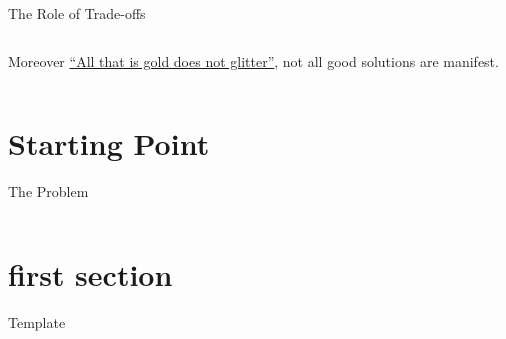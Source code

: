 \documentclass[9pt]{beamer}
\begin{document}
\begin{frame}{The Role of Trade-offs}
\begin{columns}
\begin{column}{0.5\textwidth}
            Moreover
            \href{https://en.wikipedia.org/wiki/All_that_glitters_is_not_gold\#In_popular_culture}{\enquote{All
            that is gold does not glitter}}, not all good solutions are
            manifest.
        \end{column}
    \end{columns}
\end{frame}

\section{Starting Point}

\begin{frame}{The Problem}
    \begin{columns}
        \begin{column}{0.5\textwidth}
            
        \end{column}
        \begin{column}{0.5\textwidth}
            
        \end{column}
    \end{columns}
\end{frame}

\section{first section}

\begin{frame}{Template}
    \begin{columns}
        \begin{column}{0.5\textwidth}
            
        \end{column}
        \begin{column}{0.5\textwidth}
            
        \end{column}
    \end{columns}
\end{frame}
\end{document}

